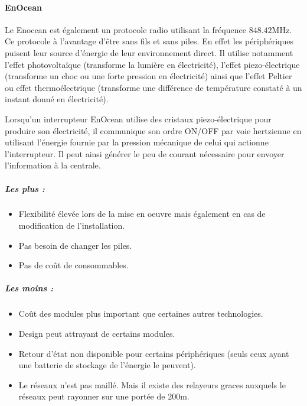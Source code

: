 \documentclass[a4paper,10pt]{article}
\begin{document}

\paragraph{EnOcean}
Le Enocean est également un protocole radio utilisant la fréquence $848.42$MHz. Ce protocole à l'avantage d'être sans fils et sans piles. En effet les périphériques puisent leur source d'énergie de leur environnement direct. Il utilise notamment l'effet photovoltaïque (transforme la lumière en électricité), l'effet piezo-électrique (transforme un choc ou une forte pression en électricité) ainsi que l’effet Peltier ou effet thermoélectrique (transforme une différence de température constaté à un instant donné en électricité).

Lorsqu’un interrupteur EnOcean utilise des cristaux piezo-électrique pour produire son électricité, il communique son ordre ON/OFF par voie hertzienne en utilisant l’énergie fournie par la pression mécanique de celui qui actionne l’interrupteur. Il peut ainsi générer le peu de courant nécessaire pour envoyer l’information à la centrale.

\subparagraph{Les plus :}
\begin{itemize}
\item Flexibilité élevée lors de la mise en oeuvre mais également en cas de modification de l'installation.
\item Pas besoin de changer les piles.
\item Pas de coût de consommables.
\end{itemize}
\subparagraph{Les moins :}
\begin{itemize}
\item Coût des modules plus important que certaines autres technologies.
\item Design peut attrayant de certains modules.
\item Retour d'état non disponible pour certains périphériques (seuls ceux ayant une batterie de stockage de l'énergie le peuvent).
\item Le réseaux n'est pas maillé. Mais il existe des relayeurs graces auxquels le réseaux peut rayonner sur une portée de 200m.\newline
\end{itemize}
\end{document}
